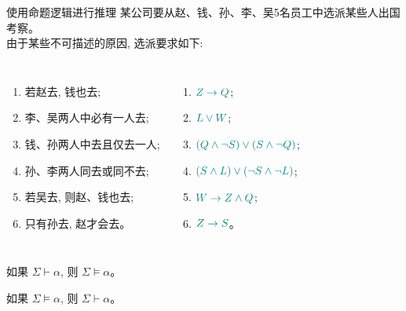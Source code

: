 \begin{frame}{}
  \begin{exampleblock}{使用命题逻辑进行推理}
    某公司要从赵、钱、孙、李、吴5名员工中选派某些人出国考察。\\
    由于某些不可描述的原因, 选派要求如下:

    \begin{columns}
        \begin{enumerate}[(1)]
          \item 若赵去, 钱也去;
          \item 李、吴两人中必有一人去;
          \item 钱、孙两人中去且仅去一人;
          \item 孙、李两人同去或同不去;
          \item 若吴去, 则赵、钱也去;
          \item 只有孙去, 赵才会去。
        \end{enumerate}
        \begin{enumerate}[(1)]
          \item $\textcolor{teal}{Z \to Q}$;
          \item $\textcolor{teal}{L \lor W}$;
          \item $\textcolor{teal}{(Q \land \lnot S) \lor (S \land \lnot Q)}$;
          \item $\textcolor{teal}{(S \land L) \lor (\lnot S \land \lnot L)}$;
          \item $\textcolor{teal}{W \to Z \land Q}$;
          \item $\textcolor{teal}{Z \to S}$。
        \end{enumerate}
    \end{columns}

    \vspace{0.50cm}
  \end{exampleblock}
\end{frame}

\begin{frame}{}
  \begin{theorem}
    如果 $\Sigma \vdash \alpha$, 则 $\Sigma \models \alpha$。
  \end{theorem}

  \vspace{0.30cm}
  \vspace{0.30cm}

  \begin{theorem}
    如果 $\Sigma \models \alpha$, 则 $\Sigma \vdash \alpha$。
  \end{theorem}
\end{frame}

%
